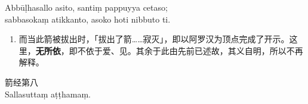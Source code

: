 Abbūḷhasallo asito, santiṃ pappuyya cetaso;\\
sabbasokaṃ atikkanto, asoko hoti nibbuto ti. %

\begin{enumerate}\item 而当此箭被拔出时，「拔出了箭……寂灭」，即以阿罗汉为顶点完成了开示。这里，\textbf{无所依}，即不依于爱、见。其余于此由先前已述故，其义自明，所以不再解释。\end{enumerate}

\begin{center}\vspace{1em}箭经第八\\Sallasuttaṃ aṭṭhamaṃ.\end{center}